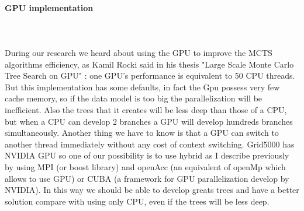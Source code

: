 \paragraph{GPU implementation}\mbox{}\\\mbox{}\\
	During our research we heard about using the GPU to improve the MCTS algorithms efficiency, as Kamil Rocki said in his thesis "Large Scale Monte Carlo Tree Search on GPU"  \cite{GPU} : one GPU's performance is equivalent to 50 CPU threads. But this implementation has some defaults, in fact the Gpu possess very few cache memory, so if the data model is too big the parallelization will be inefficient. Also the trees that it creates will be less deep than those of a CPU, but when a CPU can develop 2 branches a GPU will develop hundreds branches simultaneously. Another thing we have to know is that a GPU can switch to another thread immediately without any cost of context switching. 
	Grid5000 has NVIDIA GPU so one of our possibility is to use hybrid as I describe previously by using MPI (or boost library) and openAcc (an equivalent of openMp which allows to use GPU) or CUBA (a framework for GPU parallelization develop by NVIDIA). In this way we should be able to develop greats trees and have a better solution compare with using only CPU, even if the trees will be less deep.